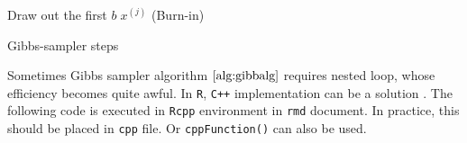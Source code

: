 \documentclass[]{book}
\theoremstyle{definition}
\theoremstyle{definition}
\theoremstyle{definition}
\theoremstyle{remark}
\begin{document}
\begin{algorithm}[H] \label{alg:gibbalg}
  \SetAlgoLined
  Draw out the first $b \; x^{(j)}$ (Burn-in)\;
  \caption{Gibbs-sampler steps}
\end{algorithm}

Sometimes Gibbs sampler algorithm \(\ref{alg:gibbalg}\) requires nested loop, whose efficiency becomes quite awful. In \texttt{R}, \texttt{C++} implementation can be a solution \citep{Wickham:2019aa}. The following code is executed in \texttt{Rcpp} environment in \texttt{rmd} document. In practice, this should be placed in \texttt{cpp} file. Or \texttt{cppFunction()} can also be used.
\end{document}
